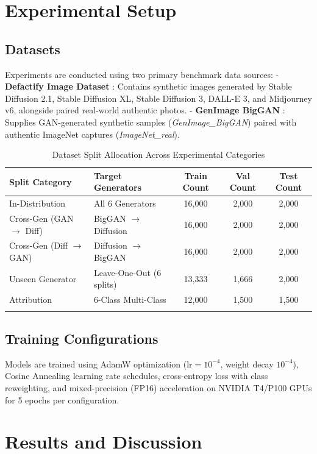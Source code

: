 \documentclass[pdflatex,sn-mathphys-num]{sn-jnl}
\theoremstyle{thmstyleone}
\theoremstyle{thmstyletwo}
\theoremstyle{thmstylethree}
\begin{document}
\section{Experimental Setup}\label{sec4}

\subsection{Datasets}\label{subsec:datasets}
Experiments are conducted using two primary benchmark data sources:
- \textbf{Defactify Image Dataset} \cite{defactify2024}: Contains synthetic images generated by Stable Diffusion 2.1, Stable Diffusion XL, Stable Diffusion 3, DALL-E 3, and Midjourney v6, alongside paired real-world authentic photos.
- \textbf{GenImage BigGAN} \cite{genimage2023}: Supplies GAN-generated synthetic samples (\textit{GenImage\_BigGAN}) paired with authentic ImageNet captures (\textit{ImageNet\_real}).

\begin{table}[h]
\caption{Dataset Split Allocation Across Experimental Categories}\label{tab:splits}
\begin{tabular}{@{}llccc@{}}
\toprule
Split Category & Target Generators & Train Count & Val Count & Test Count \\
\midrule
In-Distribution & All 6 Generators & 16,000 & 2,000 & 2,000 \\
Cross-Gen (GAN $\rightarrow$ Diff) & BigGAN $\rightarrow$ Diffusion & 16,000 & 2,000 & 2,000 \\
Cross-Gen (Diff $\rightarrow$ GAN) & Diffusion $\rightarrow$ BigGAN & 16,000 & 2,000 & 2,000 \\
Unseen Generator & Leave-One-Out (6 splits) & 13,333 & 1,666 & 2,000 \\
Attribution & 6-Class Multi-Class & 12,000 & 1,500 & 1,500 \\
\botrule
\end{tabular}
\end{table}

\subsection{Training Configurations}\label{subsec:training}
Models are trained using AdamW optimization ($\text{lr}=10^{-4}$, weight decay $10^{-4}$), Cosine Annealing learning rate schedules, cross-entropy loss with class reweighting, and mixed-precision (FP16) acceleration on NVIDIA T4/P100 GPUs for 5 epochs per configuration.

\section{Results and Discussion}\label{sec5}
\end{document}
